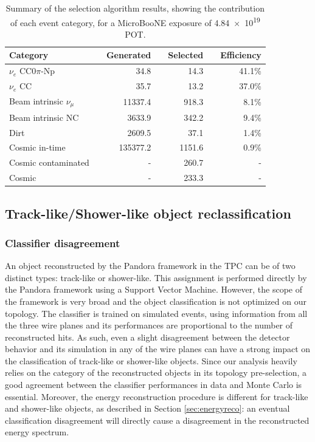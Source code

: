 \begin{table}[htbp]
   \centering
   \begin{tabular}{llrrrrr}
     \toprule
     Category & \phantom{a} & Generated & \phantom{a} & Selected & \phantom{a} & Efficiency \\
     \midrule

     $\nu_{e}$ CC0$\pi$-Np       & & 34.8     & & 14.3   & & 41.1\%\\
     $\nu_{e}$ CC                & & 35.7     & & 13.2   & & 37.0\%\\
     Beam intrinsic $\nu_{\mu}$  & & 11337.4  & & 918.3  & & 8.1\%\\
     Beam intrinsic NC           & & 3633.9   & & 342.2  & & 9.4\%\\
     Dirt                        & & 2609.5   & & 37.1   & & 1.4\%\\
     Cosmic in-time              & & 135377.2 & & 1151.6 & & 0.9\%\\
     Cosmic contaminated         & & -        & & 260.7  & & -\\
     Cosmic                      & & -        & & 233.3  & & -\\

     \bottomrule
   \end{tabular}
   \caption{Summary of the selection algorithm results, showing the contribution of each event category, for a MicroBooNE exposure of \num{4.84e19} POT.}\label{tab:result}
\end{table}

\subsection{Track-like/Shower-like object reclassification}
\subsubsection{Classifier disagreement}
An object reconstructed by the Pandora framework in the TPC can be of two distinct types: track-like or shower-like. This assignment is performed directly by the Pandora framework using a Support Vector Machine. However, the scope of the framework is very broad and the object classification is not optimized on our topology. 
The classifier is trained on simulated events, using information from all the three wire planes and its performances are proportional to the number of reconstructed hits. As such, even a slight disagreement between the detector behavior and its simulation in any of the wire planes can have a strong impact on the classification of track-like or shower-like objects. 
Since our analysis heavily relies on the category of the reconstructed objects in its topology pre-selection, a good agreement between the classifier performances in data and Monte Carlo is essential.
Moreover, the energy reconstruction procedure is different for track-like and shower-like objects, as described in Section \ref{sec:energyreco}: an eventual classification disagreement will directly cause a disagreement in the reconstructed energy spectrum.

